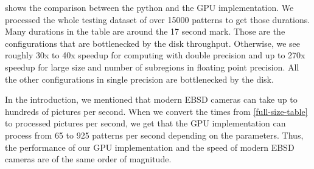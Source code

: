  shows the comparison between the python and the GPU implementation. We processed the whole testing dataset of over 15000 patterns to get those durations. Many durations in the table are around the 17 second mark. Those are the configurations that are bottlenecked by the disk throughput. Otherwise, we see roughly 30x to 40x speedup for computing with double precision and up to 270x speedup for large size and number of subregions in floating point precision. All the other configurations in single precision are bottlenecked by the disk.

In the introduction, we mentioned that modern EBSD cameras can take up to hundreds of pictures per second. When we convert the times from \cref{full-size-table} to processed pictures per second, we get that the GPU implementation can process from 65 to 925 patterns per second depending on the parameters. Thus, the performance of our GPU implementation and the speed of modern EBSD cameras are of the same order of magnitude.


